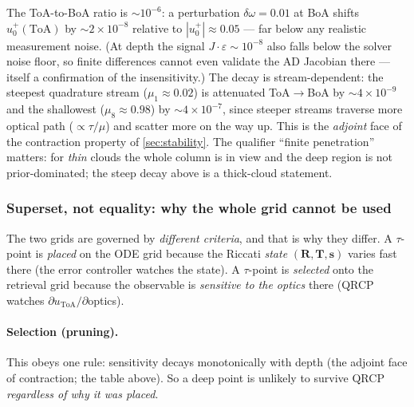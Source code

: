 \documentclass[11pt,a4paper]{article}
\newcommand{\vect}[1]{\bm{#1}}
\newcommand{\mat}[1]{\mathbf{#1}}
\theoremstyle{definition}
\begin{document}
The ToA-to-BoA ratio is ${\sim}10^{-6}$: a perturbation
$\delta\omega=0.01$ at BoA shifts $u^+_0(\mathrm{ToA})$ by
${\sim}2\times10^{-8}$ relative to $|u^+_0|\approx0.05$ --- far below any
realistic measurement noise.  (At depth the signal $J\!\cdot\!\varepsilon
\sim 10^{-8}$ also falls below the solver noise floor, so finite
differences cannot even validate the AD Jacobian there --- itself a
confirmation of the insensitivity.)  The decay is stream-dependent:
the steepest quadrature stream ($\mu_1\!\approx\!0.02$) is attenuated
ToA$\to$BoA by ${\sim}4\times10^{-9}$ and the shallowest
($\mu_8\!\approx\!0.98$) by ${\sim}4\times10^{-7}$, since steeper streams
traverse more optical path ($\propto\tau/\mu$) and scatter more on the
way up.  This is the \emph{adjoint} face of the contraction property of
\cref{sec:stability}.  The qualifier ``finite penetration'' matters: for
\emph{thin} clouds the whole column is in view and the deep region is not
prior-dominated; the steep decay above is a thick-cloud statement.

\subsubsection{Superset, not equality: why the whole grid cannot be used}

The two grids are governed by \emph{different criteria}, and that is why
they differ.  A $\tau$-point is \emph{placed} on the ODE grid because the
Riccati \emph{state} $(\mat{R},\mat{T},\vect{s})$ varies fast there (the
error controller watches the state).  A $\tau$-point is \emph{selected}
onto the retrieval grid because the observable is \emph{sensitive to the
optics} there (QRCP watches $\partial u_\mathrm{ToA}/\partial$optics).

\paragraph{Selection (pruning).}  This obeys one rule: sensitivity decays
monotonically with depth (the adjoint face of contraction; the table
above).  So a deep point is unlikely to survive QRCP \emph{regardless of
why it was placed}.
\end{document}
